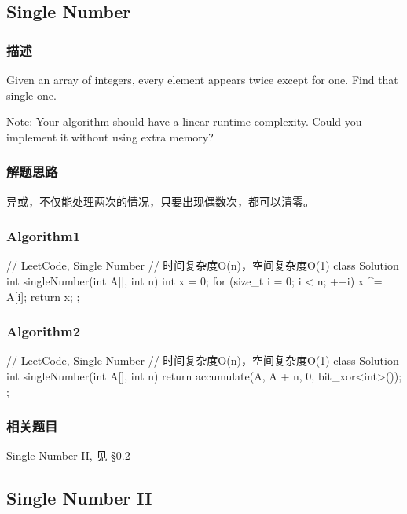 \subsection{Single Number} %
\label{sec:single-number}


\subsubsection{描述}
Given an array of integers, every element appears twice except for one. Find 
that single one.

Note:
Your algorithm should have a linear runtime complexity. Could you implement it 
without using extra memory?


\subsubsection{解题思路}
异或，不仅能处理两次的情况，只要出现偶数次，都可以清零。


\subsubsection{Algorithm1}
\begin{Code}
	// LeetCode, Single Number
	// 时间复杂度O(n)，空间复杂度O(1)
	class Solution {
		int singleNumber(int A[], int n) {
			int x = 0;
			for (size_t i = 0; i < n; ++i)
				x ^= A[i];
			return x;
		}
	};
\end{Code}


\subsubsection{Algorithm2}
\begin{Code}
	// LeetCode, Single Number
	// 时间复杂度O(n)，空间复杂度O(1)
	class Solution {
		int singleNumber(int A[], int n) {
			return accumulate(A, A + n, 0, bit_xor<int>());
		}
	};
\end{Code}


\subsubsection{相关题目}
\begindot
\item  Single Number II, 见 \S \ref{sec:single-number-ii}
\myenddot


\subsection{Single Number II} %
\label{sec:single-number-ii}


